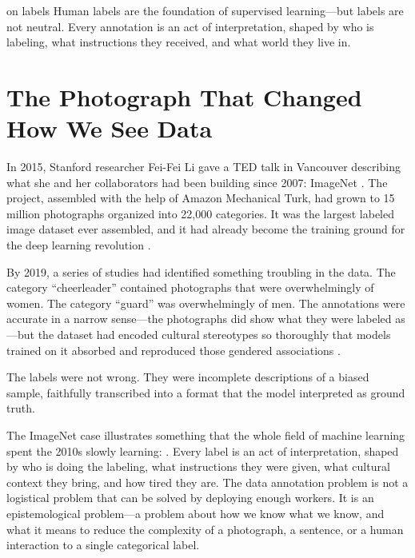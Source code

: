 
\label{chap:ch07}
\begin{chapterquote}{on labels}
Human labels are the foundation of supervised learning---but labels are not neutral. Every annotation is an act of interpretation, shaped by who is labeling, what instructions they received, and what world they live in.
\end{chapterquote}

\section{The Photograph That Changed How We See Data}
\label{sec:ch7-imagenet}

In 2015, Stanford researcher Fei-Fei Li gave a TED talk in Vancouver describing what she and her collaborators had been building since 2007: ImageNet \autocite{li2015ted}. The project, assembled with the help of Amazon Mechanical Turk, had grown to 15 million photographs organized into 22,000 categories. It was the largest labeled image dataset ever assembled, and it had already become the training ground for the deep learning revolution \autocite{deng2009imagenet}.

By 2019, a series of studies had identified something troubling in the data. The category ``cheerleader'' contained photographs that were overwhelmingly of women. The category ``guard'' was overwhelmingly of men. The annotations were accurate in a narrow sense---the photographs did show what they were labeled as---but the dataset had encoded cultural stereotypes so thoroughly that models trained on it absorbed and reproduced those gendered associations \autocite{yang2020fairer}.

The labels were not wrong. They were incomplete descriptions of a biased sample, faithfully transcribed into a format that the model interpreted as ground truth.

The ImageNet case illustrates something that the whole field of machine learning spent the 2010s slowly learning: . Every label is an act of interpretation, shaped by who is doing the labeling, what instructions they were given, what cultural context they bring, and how tired they are. The data annotation problem is not a logistical problem that can be solved by deploying enough workers. It is an epistemological problem---a problem about how we know what we know, and what it means to reduce the complexity of a photograph, a sentence, or a human interaction to a single categorical label.


